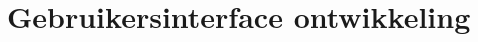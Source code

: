 \chapter{Gebruikersinterface ontwikkeling}
\label{ch:gebruikersinterface-ontwikkeling}

\lipsum[1-2]